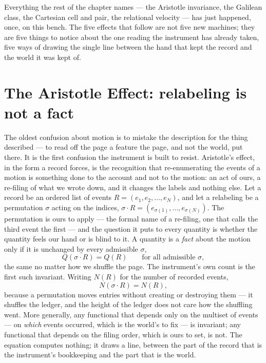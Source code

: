 Everything the rest of the chapter names --- the Aristotle invariance, the Galilean class, the Cartesian cell
and pair, the relational velocity --- has just happened, once, on this bench. The five effects that follow
are not five new machines; they are five things to notice about the one reading the instrument has already
taken, five ways of drawing the single line between the hand that kept the record and the world it was kept of.

\section{The Aristotle Effect: relabeling is not a fact}
\label{se:aristotle}

The oldest confusion about motion is to mistake the description for the thing described --- to read off the
page a feature the page, and not the world, put there. It is the first confusion the instrument is built to
resist. Aristotle's effect, in the form a record forces, is the recognition that re-enumerating the events of
a motion is something done to the account and not to the motion: an act of ours, a re-filing of what we wrote
down, and it changes the labels and nothing else. Let a record be
an ordered list of events $R = (e_1, e_2, \dots, e_N)$, and let a relabeling be a permutation $\sigma$ acting
on the indices, $\sigma \cdot R = (e_{\sigma(1)}, \dots, e_{\sigma(N)})$. The permutation is ours to apply ---
the formal name of a re-filing, one that calls the third event the first --- and the question it puts to every
quantity is whether the quantity feels our hand or is blind to it. A quantity is a \emph{fact} about the
motion only if it is unchanged by every admissible $\sigma$,
\begin{equation}
  Q(\sigma \cdot R) = Q(R) \qquad \text{for all admissible } \sigma ,
\end{equation}
the same no matter how we shuffle the page. The instrument's own count is the first such invariant. Writing
$N(R)$ for the number of recorded events,
\begin{equation}
  N(\sigma \cdot R) = N(R),
\end{equation}
because a permutation moves entries without creating or destroying them --- it shuffles the ledger, and the
height of the ledger does not care how the shuffling went. More generally, any functional that depends only on
the multiset of events --- on \emph{which} events occurred, which is the world's to fix --- is invariant; any
functional that depends on the filing order, which is ours to set, is not. The equation computes nothing; it
draws a line, between the part of the record that is the instrument's bookkeeping and the part that is the
world.

